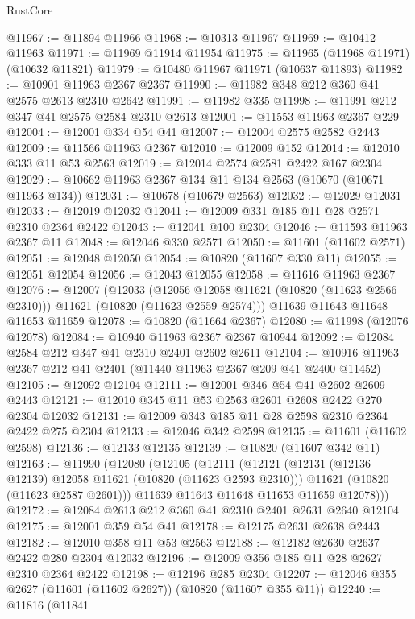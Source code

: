 \begin{lexlean}{RustCore}
\begin{coremodule}
@11967 := @11894 @11966
@11968 := @10313 @11967
@11969 := @10412 @11963
@11971 := @11969 @11914 @11954
@11975 := @11965 (@11968 @11971) (@10632 @11821)
@11979 := @10480 @11967 @11971 (@10637 @11893)
@11982 := @10901 @11963 @2367 @2367
@11990 := @11982 @348 @212 @360 @41 @2575 @2613 @2310 @2642
@11991 := @11982 @335
@11998 := @11991 @212 @347 @41 @2575 @2584 @2310 @2613
@12001 := @11553 @11963 @2367 @229
@12004 := @12001 @334 @54 @41
@12007 := @12004 @2575 @2582 @2443
@12009 := @11566 @11963 @2367
@12010 := @12009 @152
@12014 := @12010 @333 @11 @53 @2563
@12019 := @12014 @2574 @2581 @2422 @167 @2304
@12029 := @10662 @11963 @2367 @134 @11 @134 @2563 (@10670 (@10671 @11963 @134))
@12031 := @10678 (@10679 @2563)
@12032 := @12029 @12031
@12033 := @12019 @12032
@12041 := @12009 @331 @185 @11 @28 @2571 @2310 @2364 @2422
@12043 := @12041 @100 @2304
@12046 := @11593 @11963 @2367 @11
@12048 := @12046 @330 @2571
@12050 := @11601 (@11602 @2571)
@12051 := @12048 @12050
@12054 := @10820 (@11607 @330 @11)
@12055 := @12051 @12054
@12056 := @12043 @12055
@12058 := @11616 @11963 @2367
@12076 := @12007
    (@12033
      (@12056 @12058 @11621 (@10820 (@11623 @2566 @2310)))
      @11621
      (@10820 (@11623 @2559 @2574)))
    @11639
    @11643
    @11648
    @11653
    @11659
@12078 := @10820 (@11664 @2367)
@12080 := @11998 (@12076 @12078)
@12084 := @10940 @11963 @2367 @2367 @10944
@12092 := @12084 @2584 @212 @347 @41 @2310 @2401 @2602 @2611
@12104 := @10916 @11963 @2367 @212 @41 @2401 (@11440 @11963 @2367 @209 @41 @2400 @11452)
@12105 := @12092 @12104
@12111 := @12001 @346 @54 @41 @2602 @2609 @2443
@12121 := @12010 @345 @11 @53 @2563 @2601 @2608 @2422 @270 @2304 @12032
@12131 := @12009 @343 @185 @11 @28 @2598 @2310 @2364 @2422 @275 @2304
@12133 := @12046 @342 @2598
@12135 := @11601 (@11602 @2598)
@12136 := @12133 @12135
@12139 := @10820 (@11607 @342 @11)
@12163 := @11990
    (@12080
      (@12105
        (@12111
          (@12121
            (@12131 (@12136 @12139) @12058 @11621 (@10820 (@11623 @2593 @2310)))
            @11621
            (@10820 (@11623 @2587 @2601)))
          @11639
          @11643
          @11648
          @11653
          @11659
          @12078)))
@12172 := @12084 @2613 @212 @360 @41 @2310 @2401 @2631 @2640 @12104
@12175 := @12001 @359 @54 @41
@12178 := @12175 @2631 @2638 @2443
@12182 := @12010 @358 @11 @53 @2563
@12188 := @12182 @2630 @2637 @2422 @280 @2304 @12032
@12196 := @12009 @356 @185 @11 @28 @2627 @2310 @2364 @2422
@12198 := @12196 @285 @2304
@12207 := @12046 @355 @2627 (@11601 (@11602 @2627)) (@10820 (@11607 @355 @11))
@12240 := @11816
    (@11841

\end{coremodule}
\end{lexlean}
